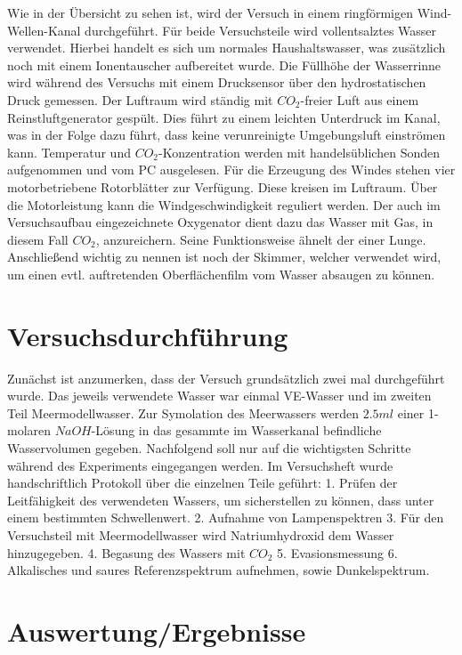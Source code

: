 \documentclass[12pt]{article}
\begin{document}
Wie in der Übersicht zu sehen ist, wird der Versuch in einem ringförmigen Wind-Wellen-Kanal durchgeführt. Für beide Versuchsteile wird vollentsalztes Wasser verwendet. Hierbei handelt es sich um normales Haushaltswasser, was zusätzlich noch mit einem Ionentauscher aufbereitet wurde. Die Füllhöhe der Wasserrinne wird während des Versuchs mit einem Drucksensor über den hydrostatischen Druck gemessen. Der Luftraum wird ständig mit $CO_2$-freier Luft aus einem Reinstluftgenerator gespült. Dies führt zu einem leichten Unterdruck im Kanal, was in der Folge dazu führt, dass keine verunreinigte Umgebungsluft einströmen kann. Temperatur und $CO_2$-Konzentration werden mit handelsüblichen Sonden aufgenommen und vom PC ausgelesen. Für die Erzeugung des Windes stehen vier motorbetriebene Rotorblätter zur Verfügung. Diese kreisen im Luftraum. Über die Motorleistung kann die Windgeschwindigkeit reguliert werden. Der auch im Versuchsaufbau eingezeichnete Oxygenator dient dazu das Wasser mit Gas, in diesem Fall $CO_2$, anzureichern. Seine Funktionsweise ähnelt der einer Lunge. Anschließend wichtig zu nennen ist noch der Skimmer, welcher verwendet wird, um einen evtl. auftretenden Oberflächenfilm vom Wasser absaugen zu können.

\section{Versuchsdurchf\"uhrung}

Zunächst ist anzumerken, dass der Versuch grundsätzlich zwei mal durchgeführt wurde. Das jeweils verwendete Wasser war einmal VE-Wasser und im zweiten Teil Meermodellwasser. Zur Symolation des Meerwassers werden $2.5ml$ einer 1-molaren $NaOH$-Lösung in das gesammte im Wasserkanal befindliche Wasservolumen gegeben.
Nachfolgend soll nur auf die wichtigsten Schritte während des Experiments eingegangen werden. Im Versuchsheft wurde handschriftlich Protokoll über die einzelnen Teile geführt:
1. Prüfen der Leitfähigkeit des verwendeten Wassers, um sicherstellen zu können, dass unter einem bestimmten Schwellenwert. 2. Aufnahme von Lampenspektren 3. Für den Versuchsteil mit Meermodellwasser wird Natriumhydroxid dem Wasser hinzugegeben. 4. Begasung des Wassers mit $CO_2$ 5. Evasionsmessung 6. Alkalisches und saures Referenzspektrum aufnehmen, sowie Dunkelspektrum.

\section{Auswertung/Ergebnisse}
\end{document}
